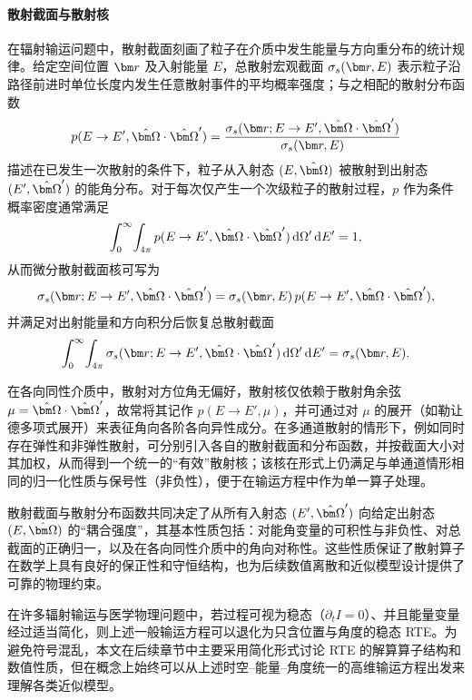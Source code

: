 \paragraph{散射截面与散射核}
在辐射输运问题中，散射截面刻画了粒子在介质中发生能量与方向重分布的统计规律。给定空间位置 $\br$ 及入射能量 $E$，总散射宏观截面 $\sigma_s(\br,E)$ 表示粒子沿路径前进时单位长度内发生任意散射事件的平均概率强度；与之相配的散射分布函数
\begin{equation}
    p(E \to E', \bOmega \cdot \bOmega')
    = \frac{\sigma_s(\br; E \to E', \bOmega \cdot \bOmega')}{\sigma_s(\br,E)}
\end{equation}
描述在已发生一次散射的条件下，粒子从入射态 $(E,\bOmega)$ 被散射到出射态 $(E',\bOmega')$ 的能角分布。对于每次仅产生一个次级粒子的散射过程，$p$ 作为条件概率密度通常满足
\begin{equation}
    \int_0^{\infty}\!\int_{4\pi}
    p(E \to E', \bOmega \cdot \bOmega')\,
    \mathrm{d}\Omega'\,\mathrm{d}E' = 1,
\end{equation}
从而微分散射截面核可写为
\begin{equation}
    \sigma_s(\br; E \to E', \bOmega \cdot \bOmega')
    = \sigma_s(\br,E)\, p(E \to E', \bOmega \cdot \bOmega'),
\end{equation}
并满足对出射能量和方向积分后恢复总散射截面
\begin{equation}
    \int_0^{\infty}\!\int_{4\pi}
    \sigma_s(\br; E \to E', \bOmega \cdot \bOmega')\,
    \mathrm{d}\Omega'\,\mathrm{d}E'
    = \sigma_s(\br,E).
\end{equation}

在各向同性介质中，散射对方位角无偏好，散射核仅依赖于散射角余弦 $\mu = \bOmega \cdot \bOmega'$，故常将其记作 $p(E \to E', \mu)$，并可通过对 $\mu$ 的展开（如勒让德多项式展开）来表征角向各阶各向异性成分。在多通道散射的情形下，例如同时存在弹性和非弹性散射，可分别引入各自的散射截面和分布函数，并按截面大小对其加权，从而得到一个统一的“有效”散射核；该核在形式上仍满足与单通道情形相同的归一化性质与保号性（非负性），便于在输运方程中作为单一算子处理。

散射截面与散射分布函数共同决定了从所有入射态 $(E',\bOmega')$ 向给定出射态 $(E,\bOmega)$ 的“耦合强度”，其基本性质包括：对能角变量的可积性与非负性、对总截面的正确归一，以及在各向同性介质中的角向对称性。这些性质保证了散射算子在数学上具有良好的保正性和守恒结构，也为后续数值离散和近似模型设计提供了可靠的物理约束。

在许多辐射输运与医学物理问题中，若过程可视为稳态（$\partial_t I = 0$）、并且能量变量经过适当简化，则上述一般输运方程可以退化为只含位置与角度的稳态 RTE。为避免符号混乱，本文在后续章节中主要采用简化形式讨论 RTE 的解算算子结构和数值性质，但在概念上始终可以从上述时空–能量–角度统一的高维输运方程出发来理解各类近似模型。

